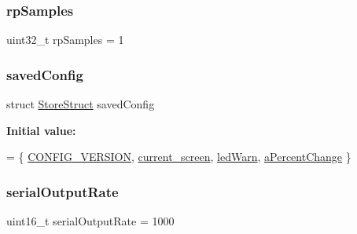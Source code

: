 \subsubsection{\texorpdfstring{rp\+Samples}{rpSamples}}
{\footnotesize\ttfamily uint32\+\_\+t rp\+Samples = 1}

\hypertarget{_u_s_b___tester___o_l_e_d__128x64___beta__2_82_8ino_aae9eaa04c38cc0832226c63e46ac334c}{}\label{_u_s_b___tester___o_l_e_d__128x64___beta__2_82_8ino_aae9eaa04c38cc0832226c63e46ac334c} 
\subsubsection{\texorpdfstring{saved\+Config}{savedConfig}}
{\footnotesize\ttfamily struct \hyperlink{struct_store_struct}{Store\+Struct}  saved\+Config}

{\bfseries Initial value\+:}
\begin{DoxyCode}
= \{ 
    \hyperlink{_u_s_b___tester___o_l_e_d__128x64___beta__2_82_8ino_a33fbd7e91d033fa1e09b4ed4de899c02}{CONFIG\_VERSION},
    \hyperlink{_u_s_b___tester___o_l_e_d__128x64___beta__2_82_8ino_a30232c834367e6367a7e5de7bd6cbc0f}{current\_screen},
    \hyperlink{_u_s_b___tester___o_l_e_d__128x64___beta__2_82_8ino_affe77e3e21edc87aea088a9f6d9cacaa}{ledWarn},
    \hyperlink{_u_s_b___tester___o_l_e_d__128x64___beta__2_82_8ino_a0ded24b71b0e1155aec127b5ad3a2fbe}{aPercentChange}
\}
\end{DoxyCode}
\hypertarget{_u_s_b___tester___o_l_e_d__128x64___beta__2_82_8ino_a60d0942dfec6a321b3e4ba97ff26e435}{}\label{_u_s_b___tester___o_l_e_d__128x64___beta__2_82_8ino_a60d0942dfec6a321b3e4ba97ff26e435} 
\subsubsection{\texorpdfstring{serial\+Output\+Rate}{serialOutputRate}}
{\footnotesize\ttfamily uint16\+\_\+t serial\+Output\+Rate = 1000}

